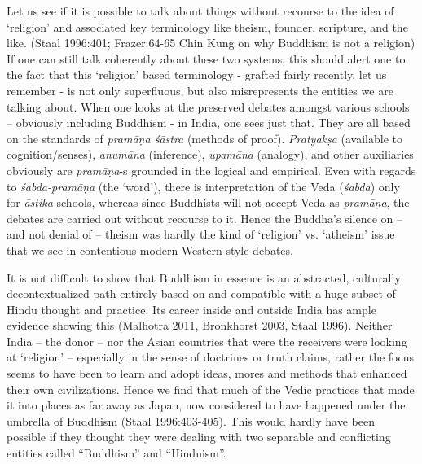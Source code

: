 Let us see if it is possible to talk about things without recourse to the idea of ‘religion’ and associated key terminology like theism, founder, scripture, and the like. (Staal 1996:401; Frazer:64-65 Chin Kung on why Buddhism is not a religion) If one can still talk coherently about these two systems, this should alert one to the fact that this ‘religion’ based terminology - grafted fairly recently, let us remember - is not only superfluous, but also misrepresents the entities we are talking about. When one looks at the preserved debates amongst various schools – obviously including Buddhism - in India, one sees just that. They are all based on the standards of \textit{pramāṇa śāstra} (methods of proof). \textit{Pratyakṣa} (available to cognition/senses), \textit{anumāna} (inference), \textit{upamāna} (analogy), and other auxiliaries obviously are \textit{pramāṇa}-s grounded in the logical and empirical. Even with regards to \textit{śabda-pramāṇa} (the ‘word’), there is interpretation of the Veda (\textit{śabda}) only for \textit{āstika} schools, whereas since Buddhists will not accept Veda as \textit{pramāṇa}, the debates are carried out without recourse to it. Hence the Buddha’s silence on – and not denial of – theism was hardly the kind of ‘religion’ vs. ‘atheism’ issue that we see in contentious modern Western style debates.

It is not difficult to show that Buddhism in essence is an abstracted, culturally decontextualized path entirely based on and compatible with a huge subset of Hindu thought and practice. Its career inside and outside India has ample evidence showing this (Malhotra 2011, Bronkhorst 2003, Staal 1996). Neither India – the donor – nor the Asian countries that were the receivers were looking at ‘religion’ – especially in the sense of doctrines or truth claims, rather the focus seems to have been to learn and adopt ideas, mores and methods that enhanced their own civilizations. Hence we find that much of the Vedic practices that made it into places as far away as Japan, now considered to have happened under the umbrella of Buddhism (Staal 1996:403-405). This would hardly have been possible if they thought they were dealing with two separable and conflicting entities called “Buddhism” and “Hinduism”.


